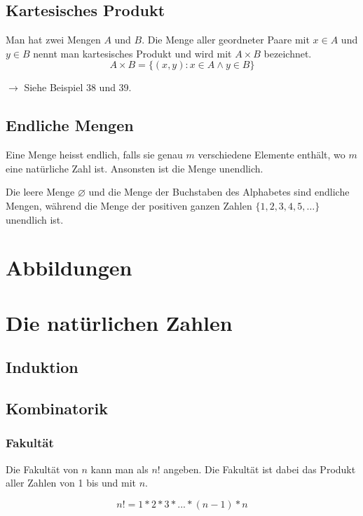 \documentclass[12pt, a4paper, oneside]{article}
\begin{document}
\subsection{Kartesisches Produkt}
Man hat zwei Mengen $A$ und $B$. Die Menge aller geordneter Paare mit $x \in A$ und $y \in B$ nennt man kartesisches Produkt und wird mit $A \times B$ bezeichnet.
\begin{equation*}
  A \times B = \{(x, y) : x \in A \land y \in B\}
\end{equation*}

$\rightarrow$ Siehe Beispiel 38 und 39.

\subsection{Endliche Mengen}
Eine Menge heisst endlich, falls sie genau $m$ verschiedene Elemente enthält, wo $m$ eine natürliche Zahl ist. Ansonsten ist die Menge unendlich.

Die leere Menge $\varnothing$ und die Menge der Buchstaben des Alphabetes sind endliche Mengen, während die Menge der positiven ganzen Zahlen $\{1, 2, 3, 4, 5,\dots\}$ unendlich ist.

\newpage
\section{Abbildungen}

\newpage
\section{Die natürlichen Zahlen}
\subsection{Induktion}

\subsection{Kombinatorik}
\subsubsection{Fakultät}
Die Fakultät von $n$ kann man als $n!$ angeben. Die Fakultät ist dabei das Produkt aller Zahlen von 1 bis und mit $n$.

\begin{equation*}
  n! = 1 * 2 * 3 * ... * (n - 1) * n
\end{equation*}
\end{document}
